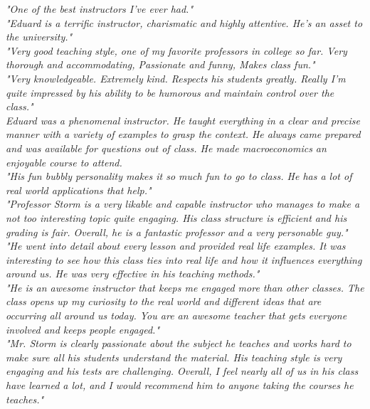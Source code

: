 \documentclass[a4paper,11pt]{article}
\begin{document}
\textit{"One of the best instructors I've ever had."} \\

\textit{"Eduard is a terrific instructor, charismatic and highly attentive. He's an asset to the university."} \\

\textit{"Very good teaching style, one of my favorite professors in college so far. Very thorough and accommodating, Passionate and funny, Makes class fun."}  \\

\textit{"Very knowledgeable. Extremely kind. Respects his students greatly. Really I'm quite impressed by his ability to be humorous and maintain control over the class."}  \\

\textit{Eduard was a phenomenal instructor. He taught everything in a clear and precise manner with a variety of examples to grasp the context. He always
	came prepared and was available for questions out of class. He made macroeconomics an enjoyable course to attend.} \\

\textit{"His fun bubbly personality makes it so much fun to go to class. He has a lot of real world applications that help."} \\

\textit{"Professor Storm is a very likable and capable instructor who manages to make a not too interesting topic quite engaging. His class structure is efficient and his grading is fair. Overall, he is a fantastic professor and a very personable guy."} \\

\textit{"He went into detail about every lesson and provided real life examples. It was interesting to see how this class ties into real life and how it influences everything around us. He was very effective in his teaching methods."} \\

\textit{"He is an awesome instructor that keeps me engaged more than other classes. The class opens up my curiosity to the real world and different ideas that are occurring all around us today. You are an awesome teacher that gets everyone involved and keeps people engaged."}  \\



\textit{"Mr. Storm is clearly passionate about the subject he teaches and works hard to make sure all his students understand the material. His teaching style is very engaging and his tests are challenging. Overall, I feel nearly all of us in his class have learned a lot, and I would recommend him to anyone taking the courses he teaches."} \\
\end{document}
